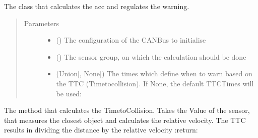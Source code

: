 \documentclass[letterpaper,10pt,english]{sphinxmanual}
\begin{document}
\begin{fulllineitems}
\label{\detokenize{no_collide:lib.nocollide.NoCollide}}
The class that calculates the acc and regulates the warning.
\begin{quote}\begin{description}
\item[{Parameters}] \leavevmode\begin{itemize}
\item {} 
 () \textendash{} The configuration of the CAN\sphinxhyphen{}Bus to initialise

\item {} 
 ({\hyperref[\detokenize{sensor:lib.sensor.SensorGroup}]{}}) \textendash{} The sensor group, on which the calculation should be done

\item {} 
 (Union{[}{\hyperref[\detokenize{no_collide:lib.nocollide.TtcTimes}]{}}, None{]}) \textendash{} The times which define when to warn based on the TTC (Time\sphinxhyphen{}to\sphinxhyphen{}collision). If None, the default
TTC\sphinxhyphen{}Times will be used: 

\end{itemize}

\end{description}\end{quote}

\begin{fulllineitems}
\label{\detokenize{no_collide:lib.nocollide.NoCollide.calc}}
The method that calculates the Time\sphinxhyphen{}to\sphinxhyphen{}Collision. Takes the Value of the sensor, that measures the closest object
and calculates the relative velocity. The TTC results in dividing the distance by the relative velocity
:return:


\end{fulllineitems}
\end{fulllineitems}
\end{document}
